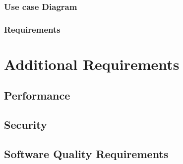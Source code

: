 \documentclass{article}
\begin{document}
\subsubsection{Use case Diagram}

\subsubsection{Requirements}

\section{Additional Requirements}

\subsection{Performance}

\subsection{Security}

\subsection{Software Quality Requirements}
\end{document}
